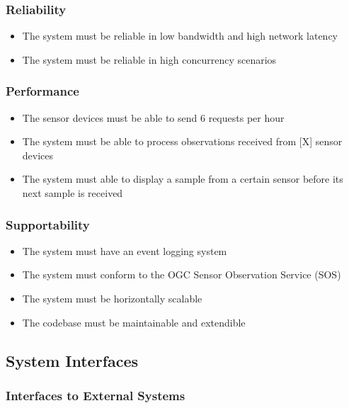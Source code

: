 \subsubsection{Reliability}

\begin{itemize}
	\item The system must be reliable in low bandwidth and high network latency
	\item The system must be reliable in high concurrency scenarios
\end{itemize}

\subsubsection{Performance}

\begin{itemize}
	\item The sensor devices must be able to send 6 requests per hour
	\item The system must be able to process observations received from [X] sensor devices
	\item The system must able to display a sample from a certain sensor before its next sample is received
\end{itemize}

\subsubsection{Supportability}

\begin{itemize}
	\item The system must have an event logging system
	\item The system must conform to the OGC Sensor Observation Service (SOS)
	\item The system must be horizontally scalable
	\item The codebase must be maintainable and extendible
\end{itemize}

\subsection{System Interfaces}

\subsubsection{Interfaces to External Systems}

